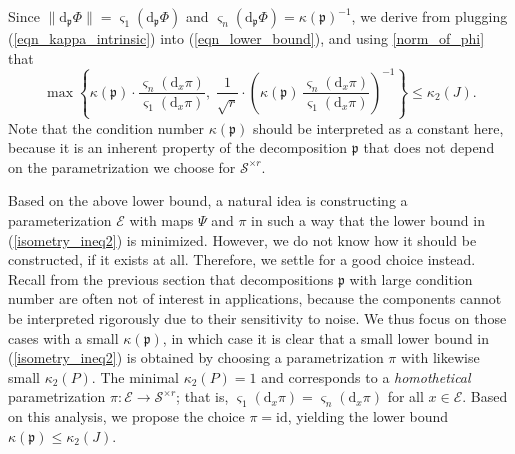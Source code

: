 \documentclass[a4paper,10pt,final]{siamart1116}
\newcommand{\tuple}[1]{\mathfrak{#1}}
\newcommand{\Var}[1]{\mathcal{#1}}
\newcommand{\deriv}[2]{\mathrm{d}_{#1}#2}
\newcommand{\reflem}[1]{\cref{#1}}
\newcommand{\refeqn}[1]{{(\ref{#1})}}
\numberwithin{equation}{section}
\numberwithin{figure}{section}
\numberwithin{table}{section}
\numberwithin{theorem}{section}
\begin{document}
Since $\|\deriv{\tuple{p}}{\Phi}\| = \varsigma_1( \deriv{\tuple{p}}{\Phi} )$ and $\varsigma_n( \deriv{\tuple{p}}{\Phi})  = \kappa(\tuple{p})^{-1}$, we derive from plugging \refeqn{eqn_kappa_intrinsic} into \refeqn{eqn_lower_bound}, and using \reflem{norm_of_phi} that
\begin{equation}\label{isometry_ineq2}
\max\left\{
\kappa(\tuple{p}) \cdot \frac{\varsigma_{n}(\deriv{x}{\pi})}{\varsigma_{1}(\deriv{x}{\pi})},\;
\frac{1}{\sqrt{r}} \cdot \left( \kappa(\tuple{p})\, \frac{\varsigma_{n}(\deriv{x}{\pi})}{\varsigma_{1}(\deriv{x}{\pi})} \right)^{-1}
\right\}
\leq \kappa_2(J).
\end{equation}
Note that the condition number $\kappa(\tuple p)$ should be interpreted as a constant here, because it is an inherent property of the decomposition $\tuple p$ that does not depend on the parametrization we choose for $\Var{S}^{\times r}$.

Based on the above lower bound, a natural idea is constructing a parameterization $\Var{E}$ with maps $\Psi$ and $\pi$ in such a way that the lower bound in \refeqn{isometry_ineq2} is minimized. However, we do not know how it should be constructed, if it exists at all. Therefore, we settle for a good choice instead. Recall from the previous section that decompositions $\tuple{p}$ with large condition number are often not of interest in applications, because the components cannot be interpreted rigorously due to their sensitivity to noise. We thus focus on those cases with a small $\kappa(\tuple{p})$, in which case it is clear that a small lower bound in \refeqn{isometry_ineq2} is obtained by choosing a parametrization $\pi$ with likewise small $\kappa_2(P)$. The minimal $\kappa_2(P) = 1$ and corresponds to a {\emph{homothetical}} parametrization $\pi : \Var{E} \to \Var{S}^{\times r}$; {that is,} $\varsigma_{1}(\deriv{x}{\pi})=\varsigma_{n}(\deriv{x}{\pi})$ for all $x\in\Var E$.
Based on this analysis, we propose the choice $\pi=\mathrm{id}$, yielding the lower bound $\kappa(\tuple{p}) \le \kappa_2(J)$.%
\end{document}
